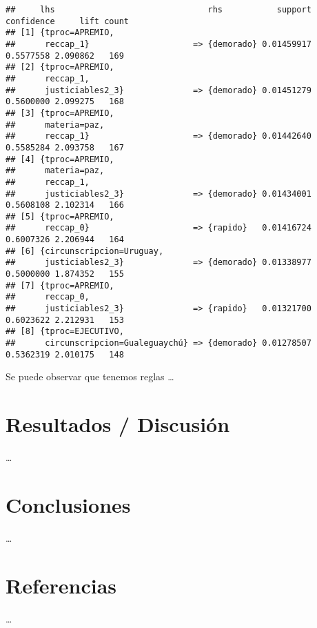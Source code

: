 \documentclass[runningheads,a4paper]{llncs}
\begin{document}
\begin{verbatim}
##     lhs                               rhs           support confidence     lift count
## [1] {tproc=APREMIO,                                                                  
##      reccap_1}                     => {demorado} 0.01459917  0.5577558 2.090862   169
## [2] {tproc=APREMIO,                                                                  
##      reccap_1,                                                                       
##      justiciables2_3}              => {demorado} 0.01451279  0.5600000 2.099275   168
## [3] {tproc=APREMIO,                                                                  
##      materia=paz,                                                                    
##      reccap_1}                     => {demorado} 0.01442640  0.5585284 2.093758   167
## [4] {tproc=APREMIO,                                                                  
##      materia=paz,                                                                    
##      reccap_1,                                                                       
##      justiciables2_3}              => {demorado} 0.01434001  0.5608108 2.102314   166
## [5] {tproc=APREMIO,                                                                  
##      reccap_0}                     => {rapido}   0.01416724  0.6007326 2.206944   164
## [6] {circunscripcion=Uruguay,                                                        
##      justiciables2_3}              => {demorado} 0.01338977  0.5000000 1.874352   155
## [7] {tproc=APREMIO,                                                                  
##      reccap_0,                                                                       
##      justiciables2_3}              => {rapido}   0.01321700  0.6023622 2.212931   153
## [8] {tproc=EJECUTIVO,                                                                
##      circunscripcion=Gualeguaychú} => {demorado} 0.01278507  0.5362319 2.010175   148
\end{verbatim}

\normalsize

Se puede observar que tenemos reglas \ldots{}

\section{Resultados / Discusión}\label{resultados-discusion}

\ldots{}

\section{Conclusiones}\label{conclusiones}

\ldots{}

\section{Referencias}\label{referencias}

\ldots{}
\end{document}
